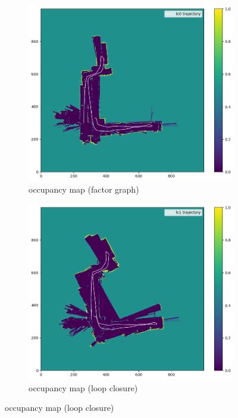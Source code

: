 \documentclass[conference]{IEEEtran}
\begin{document}
\begin{figure}
\begin{subfigure}{0.24\textwidth}
        \label{fig:omap_21_icp}
    \end{subfigure}
    \hfill
    \begin{subfigure}{0.24\textwidth}
        \includegraphics[width=\linewidth]{../img/omap_21_lc0.png}
        \caption{occupancy map (factor graph)}
        \label{fig:omap_21_lc0}
    \end{subfigure}
    \hfill
    \begin{subfigure}{0.24\textwidth}
        \includegraphics[width=\linewidth]{../img/omap_21_lc1.png}
        \caption{occupancy map (loop closure)}
        \label{fig:omap_21_lc1}
    \end{subfigure}
    

\end{figure}
\end{document}
